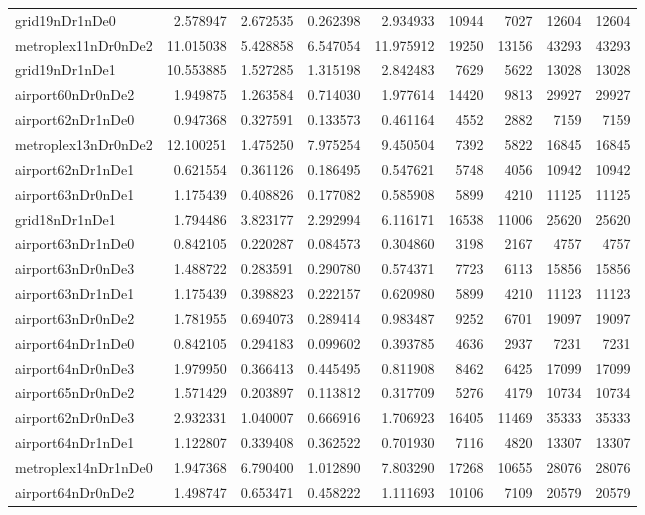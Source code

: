 \begin{longtable}{|l|r|r|r|r|r|r|r|r|}
grid19nDr1nDe0 & 2.578947 & 2.672535 & 0.262398 & 2.934933 & 10944 & 7027 & 12604 & 12604 \\
metroplex11nDr0nDe2 & 11.015038 & 5.428858 & 6.547054 & 11.975912 & 19250 & 13156 & 43293 & 43293 \\
grid19nDr1nDe1 & 10.553885 & 1.527285 & 1.315198 & 2.842483 & 7629 & 5622 & 13028 & 13028 \\
airport60nDr0nDe2 & 1.949875 & 1.263584 & 0.714030 & 1.977614 & 14420 & 9813 & 29927 & 29927 \\
airport62nDr1nDe0 & 0.947368 & 0.327591 & 0.133573 & 0.461164 & 4552 & 2882 & 7159 & 7159 \\
metroplex13nDr0nDe2 & 12.100251 & 1.475250 & 7.975254 & 9.450504 & 7392 & 5822 & 16845 & 16845 \\
airport62nDr1nDe1 & 0.621554 & 0.361126 & 0.186495 & 0.547621 & 5748 & 4056 & 10942 & 10942 \\
airport63nDr0nDe1 & 1.175439 & 0.408826 & 0.177082 & 0.585908 & 5899 & 4210 & 11125 & 11125 \\
grid18nDr1nDe1 & 1.794486 & 3.823177 & 2.292994 & 6.116171 & 16538 & 11006 & 25620 & 25620 \\
airport63nDr1nDe0 & 0.842105 & 0.220287 & 0.084573 & 0.304860 & 3198 & 2167 & 4757 & 4757 \\
airport63nDr0nDe3 & 1.488722 & 0.283591 & 0.290780 & 0.574371 & 7723 & 6113 & 15856 & 15856 \\
airport63nDr1nDe1 & 1.175439 & 0.398823 & 0.222157 & 0.620980 & 5899 & 4210 & 11123 & 11123 \\
airport63nDr0nDe2 & 1.781955 & 0.694073 & 0.289414 & 0.983487 & 9252 & 6701 & 19097 & 19097 \\
airport64nDr1nDe0 & 0.842105 & 0.294183 & 0.099602 & 0.393785 & 4636 & 2937 & 7231 & 7231 \\
airport64nDr0nDe3 & 1.979950 & 0.366413 & 0.445495 & 0.811908 & 8462 & 6425 & 17099 & 17099 \\
airport65nDr0nDe2 & 1.571429 & 0.203897 & 0.113812 & 0.317709 & 5276 & 4179 & 10734 & 10734 \\
airport62nDr0nDe3 & 2.932331 & 1.040007 & 0.666916 & 1.706923 & 16405 & 11469 & 35333 & 35333 \\
airport64nDr1nDe1 & 1.122807 & 0.339408 & 0.362522 & 0.701930 & 7116 & 4820 & 13307 & 13307 \\
metroplex14nDr1nDe0 & 1.947368 & 6.790400 & 1.012890 & 7.803290 & 17268 & 10655 & 28076 & 28076 \\
airport64nDr0nDe2 & 1.498747 & 0.653471 & 0.458222 & 1.111693 & 10106 & 7109 & 20579 & 20579 \\

\end{longtable}
